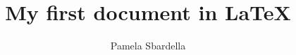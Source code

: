 









\usepackage[utf8]{inputenc}

\usepackage{graphicx} %

\usepackage{color}

\usepackage{hyperref}


\usepackage{listings}

\usepackage{natbib}


\title{My first document in LaTeX}

\author{Pamela Sbardella}

\date{}



\maketitle

